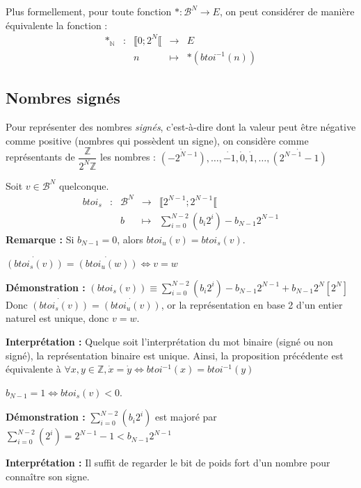 \documentclass[../../main.tex]{subfiles}
\begin{document}
Plus formellement, pour toute fonction $\ast : \mathcal{B}^{N} \rightarrow E$, on peut considérer de manière équivalente la fonction :
$$
\begin{array}{lclcl}
\ast_{\mathbb{N}} & : & \llbracket 0;2^{N}\llbracket  & \rightarrow & E \\
     &   & n & \mapsto & \ast{(btoi^{-1}{(n)})}
\end{array}
$$
\subsection{Nombres signés}
Pour représenter des nombres \textit{signés}, c'est-à-dire dont la valeur peut être négative comme positive (nombres qui possèdent un signe), on considère comme représentants de $\dfrac{\mathbb{Z}}{2^{N}\mathbb{Z}}$ les nombres : $\dot{(-2^{N-1})}, \dots, \dot{-1}, \dot{0}, \dot{1}, \dots, \dot{(2^{N-1}-1)}$

Soit $v\in{\mathcal{B}^{N}}$ quelconque.
$$
\begin{array}{lclcl}
btoi_{s} & : & \mathcal{B}^{N} & \rightarrow & \llbracket 2^{N-1}; 2^{N-1}\llbracket  \\
     &   & b & \mapsto & \displaystyle\sum_{i = 0}^{N-2}(b_{i}2^{i}) - b_{N-1}2^{N-1}
\end{array}
$$
\textbf{Remarque :} Si $b_{N-1} = 0$, alors $btoi_{u}(v) = btoi_{s}(v)$.

\proposition{} $\dot{(btoi_{s}(v))} = \dot{(btoi_{u}(w))} \Leftrightarrow v = w$

\textbf{Démonstration :} $(btoi_{s}(v)) \equiv \displaystyle\sum_{i = 0}^{N-2}(b_{i}2^{i}) - b_{N-1}2^{N-1} + b_{N-1}2^{N} [2^{N}]$ \newline
Donc $\dot{(btoi_{s}(v))} = \dot{(btoi_{u}(v))}$, or la représentation en base 2 d'un entier naturel est unique, donc $v = w$.

\textbf{Interprétation :} Quelque soit l'interprétation du mot binaire (signé ou non signé), la représentation binaire est unique. Ainsi, la proposition précédente est équivalente à $\forall{x, y\in{\mathbb{Z}}}, \dot{x} = \dot{y} \Leftrightarrow btoi^{-1}(x) = btoi^{-1}(y)$

\proposition{} $b_{N-1} = 1 \Leftrightarrow btoi_{s}(v) < 0$.

\textbf{Démonstration :} $\displaystyle\sum_{i = 0}^{N-2}(b_{i}2^{i})$ est majoré par $\displaystyle\sum_{i = 0}^{N-2}(2^{i}) = 2^{N-1} - 1 < b_{N-1}2^{N-1}$

\textbf{Interprétation :} Il suffit de regarder le bit de poids fort d'un nombre pour connaître son signe.
\end{document}
